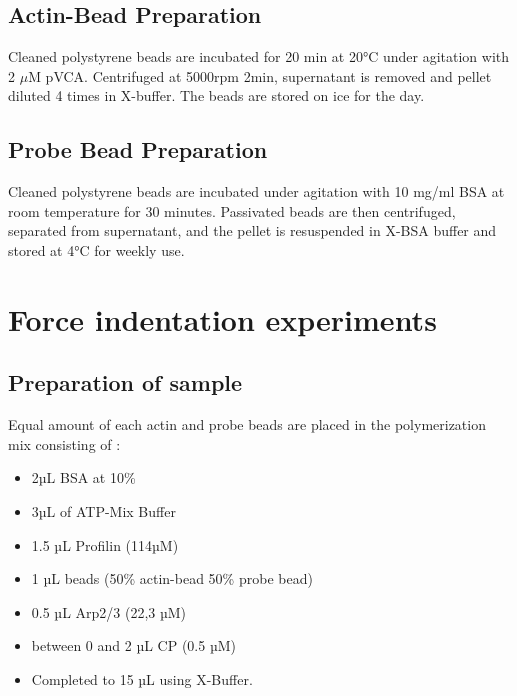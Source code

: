 \documentclass[A4paperpaper,11pt,english]{sphinxmanual}
\begin{document}
\subsection{Actin-Bead Preparation}
\label{index-latex:actin-bead-preparation}
Cleaned polystyrene beads are incubated for 20 min at 20°C under agitation with
2 \(\mu\)M pVCA. Centrifuged at 5000rpm 2min, supernatant is removed and pellet
diluted 4 times in X-buffer. The beads are stored on ice for the day.


\subsection{Probe Bead Preparation}
\label{index-latex:probe-bead-preparation}
Cleaned polystyrene beads are incubated under agitation with 10 mg/ml BSA at
room temperature for 30 minutes. Passivated beads are then centrifuged,
separated from supernatant, and the pellet is resuspended in X-BSA buffer and
stored at 4°C for weekly use.


\section{Force indentation experiments}
\label{index-latex:id7}\label{index-latex:force-indentation-experiments}

\subsection{Preparation of sample}
\label{index-latex:preparation-of-sample}
Equal amount of each actin and probe beads are placed in the polymerization
mix consisting of :
\begin{itemize}
\item {} 
2µL BSA at 10\%

\item {} 
3µL of ATP-Mix Buffer

\item {} 
1.5 µL Profilin (114µM)

\item {} 
1 µL beads (50\% actin-bead 50\% probe bead)

\item {} 
0.5 µL Arp2/3 (22,3 µM)

\item {} 
between 0 and 2 µL CP (0.5 µM)

\item {} 
Completed to 15 µL using X-Buffer.

\end{itemize}
\end{document}
